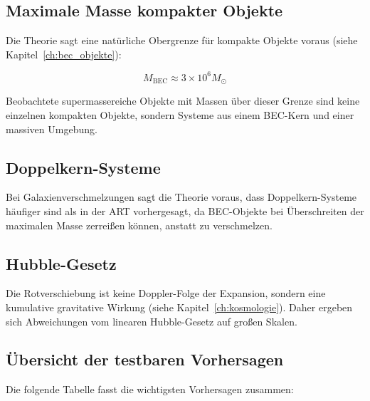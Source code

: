 \subsection{Maximale Masse kompakter Objekte}
\label{sub:vorh_max_masse}

Die Theorie sagt eine natürliche Obergrenze für kompakte Objekte voraus (siehe Kapitel~\ref{ch:bec_objekte}):

\[
M_{\text{BEC}} \approx 3 \times 10^6 M_{\odot}
\]

Beobachtete supermassereiche Objekte mit Massen über dieser Grenze sind keine einzelnen kompakten Objekte, sondern Systeme aus einem BEC-Kern und einer massiven Umgebung.

\subsection{Doppelkern-Systeme}
\label{sub:vorh_doppelkern}

Bei Galaxienverschmelzungen sagt die Theorie voraus, dass Doppelkern-Systeme häufiger sind als in der ART vorhergesagt, da BEC-Objekte bei Überschreiten der maximalen Masse zerreißen können, anstatt zu verschmelzen.

\subsection{Hubble-Gesetz}
\label{sub:vorh_hubble}

Die Rotverschiebung ist keine Doppler-Folge der Expansion, sondern eine kumulative gravitative Wirkung (siehe Kapitel~\ref{ch:kosmologie}). Daher ergeben sich Abweichungen vom linearen Hubble-Gesetz auf großen Skalen.

\subsection{Übersicht der testbaren Vorhersagen}
\label{sub:vorh_uebersicht}

Die folgende Tabelle fasst die wichtigsten Vorhersagen zusammen:

